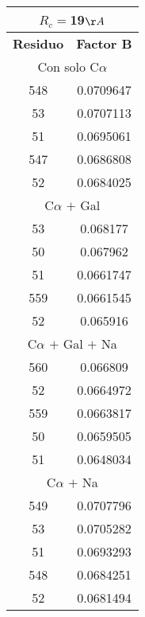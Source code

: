 \begin{tabular}[c]{|c|c|}
\multicolumn{2}{c}{$R_c=$19$\AA$}\\\hline
\textbf{Residuo}&\textbf{Factor B}\\\hline
\multicolumn{2}{c}{Con solo C$\alpha$}\\\hline
       548& 0.0709647\\
        53& 0.0707113\\
        51& 0.0695061\\
       547& 0.0686808\\
        52& 0.0684025\\\hline
\multicolumn{2}{c}{C$\alpha$ $+$ Gal}\\\hline
        53&  0.068177\\
        50&  0.067962\\
        51& 0.0661747\\
       559& 0.0661545\\
        52&  0.065916\\\hline
\multicolumn{2}{c}{C$\alpha$ $+$ Gal $+$ Na}\\\hline
       560&  0.066809\\
        52& 0.0664972\\
       559& 0.0663817\\
        50& 0.0659505\\
        51& 0.0648034\\\hline
\multicolumn{2}{c}{C$\alpha$ $+$ Na}\\\hline
       549& 0.0707796\\
        53& 0.0705282\\
        51& 0.0693293\\
       548& 0.0684251\\
        52& 0.0681494\\\hline
\end{tabular}
